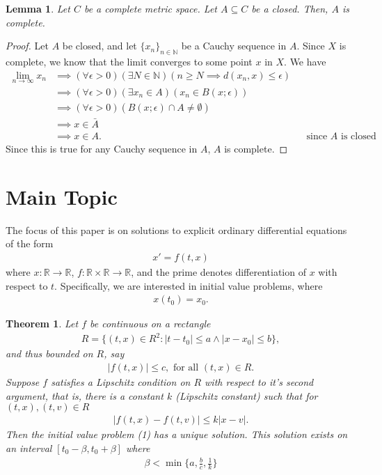 \documentclass[10pt,a4paper]{article}
\theoremstyle{theorem}
\newtheorem{theorem}{Theorem}
\newtheorem{lemma}{Lemma}
\theoremstyle{definition}
\begin{document}
\begin{lemma}
Let $C$ be a complete metric space. Let $A \subseteq C$ be a closed. Then, $A$ is complete.
\end{lemma}

\begin{proof}
Let $A$ be closed, and let $\{x_n\}_{n \in \mathbb{N}}$ be a Cauchy sequence in $A$.  Since $X$ is complete, we know that the limit converges to some point $x$ in $X$.  We have
\begin{align*}
\lim_{n \to \infty} x_n &\implies (\forall \epsilon > 0)(\exists N \in \mathbb{N})(n \geq N \implies d(x_n, x) \leq \epsilon)\\
&\implies (\forall \epsilon > 0)(\exists x_n \in A)(x_n \in B(x; \epsilon))\\
&\implies (\forall \epsilon > 0)(B(x; \epsilon) \cap A \not = \emptyset)\\
&\implies x \in \bar{A}\\
&\implies x \in A. && \text{since } A \text{ is closed}
\end{align*}
Since this is true for any Cauchy sequence in $A$, $A$ is complete.
\end{proof}

\section{Main Topic}
The focus of this paper is on solutions to explicit ordinary differential equations of the form
\begin{align}
x' = f(t, x)
\end{align}
where $x: \mathbb{R} \to \mathbb{R}$, $f: \mathbb{R} \times \mathbb{R} \to \mathbb{R}$, and the prime denotes differentiation of $x$ with respect to $t$.  Specifically, we are interested in initial value problems, where
\begin{align*}
x(t_0) = x_0.
\end{align*}

\begin{theorem}
Let $f$ be continuous on a rectangle 
\begin{align*}
R = \{(t, x) \mathbb \in {R}^2 : |t - t_0| \leq a \land |x - x_0| \leq b \},
\end{align*}
and thus bounded on $R$, say
\begin{align}
|f(t, x)| \leq c, \text{ for all } (t, x) \in R.
\end{align}
Suppose $f$ satisfies a Lipschitz condition on $R$ with respect to it's second argument, that is, there is a constant $k$ (Lipschitz constant) such that for $(t, x), (t, v) \in R$
\begin{align}
|f(t, x) - f(t, v)| \leq k |x - v|.
\end{align}
Then the initial value problem (1) has a unique solution. This solution exists on an interval $[t_0 - \beta, t_0 + \beta]$ where 
\begin{align}
\beta < \min \Bigg \{a, \frac{b}{c}, \frac{1}{k} \Bigg \}
\end{align}
\end{theorem}
\end{document}
